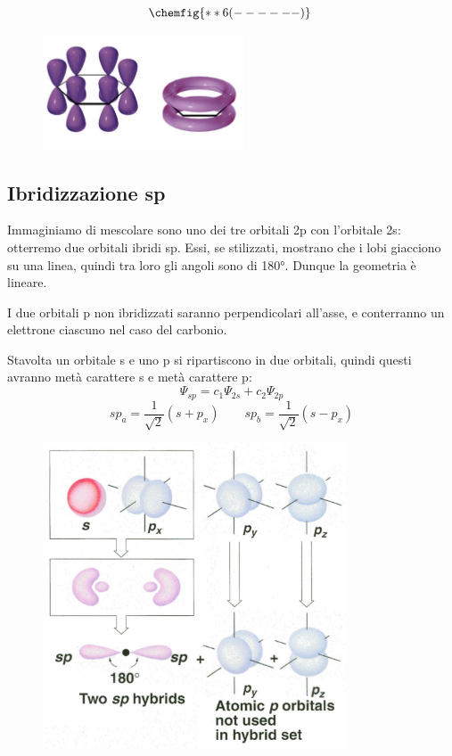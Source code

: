 \hspace{1cm}\begin{minipage}{0.4\textwidth}
    $$
    \chemfig{**6(------)}\
    $$
\end{minipage} \hfill
\begin{minipage}{0.6\textwidth}
    \begin{figure}[H]
        \includegraphics[width=6cm]{immagini/benzene.png}
    \end{figure}
\end{minipage}

\subsection{Ibridizzazione sp}
Immaginiamo di mescolare sono uno dei tre orbitali 2p con l'orbitale 2s: otterremo due orbitali ibridi sp. Essi, se stilizzati, mostrano che i lobi giacciono su una linea, quindi tra loro gli angoli sono di 180°. Dunque la geometria è lineare.

I due orbitali p non ibridizzati saranno perpendicolari all'asse, e conterranno un elettrone ciascuno nel caso del carbonio.

Stavolta un orbitale s e uno p si ripartiscono in due orbitali, quindi questi avranno metà carattere s e metà carattere p:
$$\Psi_{sp}= c_1\Psi_{2s} + c_2\Psi_{2p}$$
$$
sp_a=\frac{1}{\sqrt{2}}(s + p_x)
\qquad
sp_b=\frac{1}{\sqrt{2}}(s - p_x)
$$
\begin{figure}[H]
    \centering
    \includegraphics[width=9cm]{immagini/orbitali-sp.png}
\end{figure}

